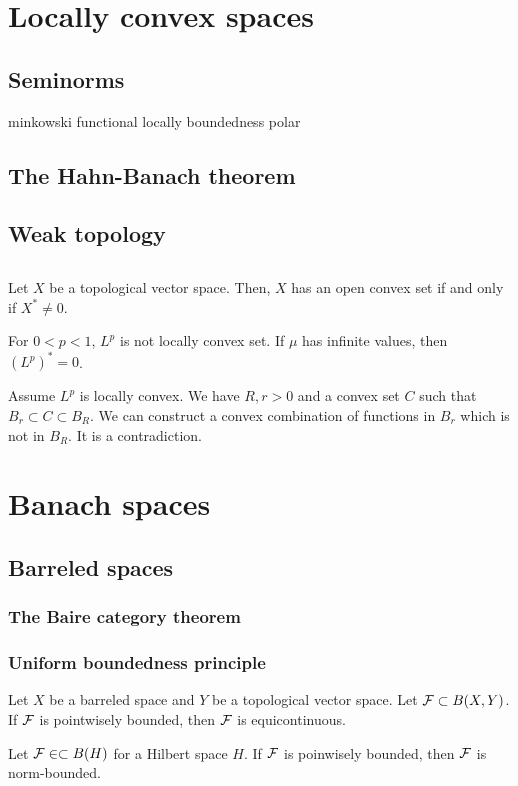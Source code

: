 \documentclass{../crs}
\begin{document}
\chapter{Locally convex spaces}
\section{Seminorms}
minkowski functional
locally boundedness
polar

\section{The Hahn-Banach theorem}

\section{Weak topology}

\section{}
\begin{prop}
Let $X$ be a topological vector space.
Then, $X$ has an open convex set if and only if $X^*\ne0$.
\end{prop}
\begin{prop}
For $0<p<1$, $L^p$ is not locally convex set.
If $\mu$ has infinite values, then $(L^p)^*=0$.
\end{prop}
\begin{pf}
Assume $L^p$ is locally convex.
We have $R,r>0$ and a convex set $C$ such that $B_r\subset C\subset B_R$.
We can construct a convex combination of functions in $B_r$ which is not in $B_R$.
It is a contradiction.
\end{pf}

\chapter{Banach spaces}



\section{Barreled spaces}

\subsection{The Baire category theorem}

\subsection{Uniform boundedness principle}
\begin{thm}
Let $X$ be a barreled space and $Y$ be a topological vector space.
Let $\mathcal{F}\subset B(X,Y)$.
If $\mathcal{F}$ is pointwisely bounded, then $\mathcal{F}$ is equicontinuous.
\end{thm}
\begin{cor}
Let $\mathcal{F}\in\subset B(H)$ for a Hilbert space $H$.
If $\mathcal{F}$ is poinwisely bounded, then $\mathcal{F}$ is norm-bounded.
\end{cor}
\end{document}

